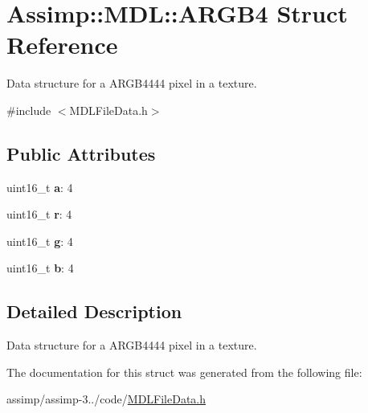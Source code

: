 \hypertarget{struct_assimp_1_1_m_d_l_1_1_a_r_g_b4}{\section{Assimp\+:\+:M\+D\+L\+:\+:A\+R\+G\+B4 Struct Reference}
\label{struct_assimp_1_1_m_d_l_1_1_a_r_g_b4}
}


Data structure for a A\+R\+G\+B4444 pixel in a texture.  




{\ttfamily \#include $<$M\+D\+L\+File\+Data.\+h$>$}

\subsection*{Public Attributes}
\begin{DoxyCompactItemize}
\item 
\hypertarget{struct_assimp_1_1_m_d_l_1_1_a_r_g_b4_a0ab81c8a060342383bba2b99fca1deae}{uint16\+\_\+t {\bfseries a}\+: 4}\label{struct_assimp_1_1_m_d_l_1_1_a_r_g_b4_a0ab81c8a060342383bba2b99fca1deae}

\item 
\hypertarget{struct_assimp_1_1_m_d_l_1_1_a_r_g_b4_a5cf080441229b0b8d1a87a8fc4bfff6a}{uint16\+\_\+t {\bfseries r}\+: 4}\label{struct_assimp_1_1_m_d_l_1_1_a_r_g_b4_a5cf080441229b0b8d1a87a8fc4bfff6a}

\item 
\hypertarget{struct_assimp_1_1_m_d_l_1_1_a_r_g_b4_a1eb9fc3451f685ef66bb85fc1efb0ca6}{uint16\+\_\+t {\bfseries g}\+: 4}\label{struct_assimp_1_1_m_d_l_1_1_a_r_g_b4_a1eb9fc3451f685ef66bb85fc1efb0ca6}

\item 
\hypertarget{struct_assimp_1_1_m_d_l_1_1_a_r_g_b4_a2f74184820d50090b5ce91d92229822f}{uint16\+\_\+t {\bfseries b}\+: 4}\label{struct_assimp_1_1_m_d_l_1_1_a_r_g_b4_a2f74184820d50090b5ce91d92229822f}

\end{DoxyCompactItemize}


\subsection{Detailed Description}
Data structure for a A\+R\+G\+B4444 pixel in a texture. 

The documentation for this struct was generated from the following file\+:\begin{DoxyCompactItemize}
\item 
assimp/assimp-\/3../code/\hyperlink{_m_d_l_file_data_8h}{M\+D\+L\+File\+Data.\+h}\end{DoxyCompactItemize}
